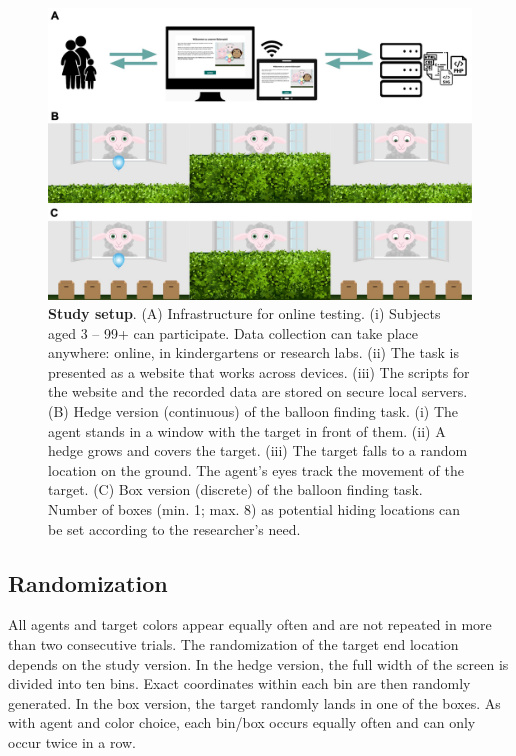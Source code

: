 \documentclass[
  man,floatsintext]{apa6}
\begin{document}
\begin{figure}

{\centering \includegraphics[width=1\linewidth]{../figures/gafo_procedure} 

}

\caption{\textbf{Study setup}.
(A) Infrastructure for online testing. (i) Subjects aged 3 -- 99+ can participate. Data collection can take place anywhere: online, in kindergartens or research labs. (ii) The task is presented as a website that works across devices. (iii) The scripts for the website and the recorded data are stored on secure local servers.
(B) Hedge version (continuous) of the balloon finding task. (i) The agent stands in a window with the target in front of them. (ii) A hedge grows and covers the target. (iii) The target falls to a random location on the ground. The agent's eyes track the movement of the target.
(C) Box version (discrete) of the balloon finding task. Number of boxes (min. 1; max. 8) as potential hiding locations can be set according to the researcher's need.}\label{fig:fig1}
\end{figure}

\hypertarget{randomization}{%
\subsection{Randomization}\label{randomization}}

All agents and target colors appear equally often and are not repeated in more than two consecutive trials. The randomization of the target end location depends on the study version. In the hedge version, the full width of the screen is divided into ten bins. Exact coordinates within each bin are then randomly generated. In the box version, the target randomly lands in one of the boxes. As with agent and color choice, each bin/box occurs equally often and can only occur twice in a row.
\end{document}
